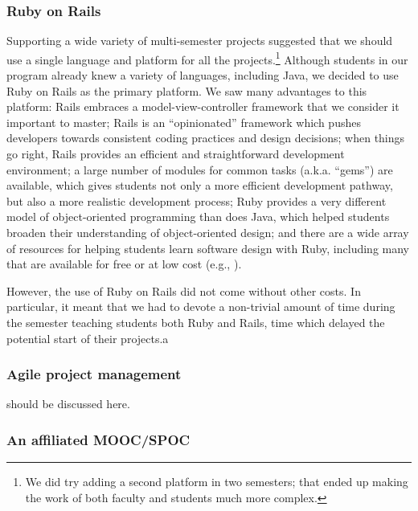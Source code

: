 
\subsubsection{Ruby on Rails}

Supporting a wide variety of multi-semester projects suggested that
we should use a single language and platform for all the
projects.\footnote{We did try adding a second platform in two
semesters; that ended up making the work of both faculty and students
much more complex.}  Although students in our program already knew
a variety of languages, including Java, we decided to use Ruby on
Rails as the primary platform.  We saw many advantages to this
platform: Rails embraces a model-view-controller framework that we
consider it important to master; Rails is an ``opinionated'' framework 
which pushes developers towards consistent coding practices and 
design decisions; when things go right, Rails
provides an efficient and straightforward development environment;
a large number of modules for common tasks (a.k.a. ``gems'') are
available, which gives students not only a more efficient development
pathway, but also a more realistic development process; Ruby
provides a very different model of object-oriented programming than
does Java, which helped students broaden their understanding of
object-oriented design; and there are a wide array of resources for
helping students learn software design with Ruby, including many
that are available for free or at low cost (e.g.,
\cite{saasbook,rails-tutorial}).

However, the use of Ruby on Rails did not come without other costs.  In
particular, it meant that we had to devote a non-trivial amount of
time during the semester teaching students both Ruby and Rails, time
which delayed the potential start of their projects.a

\subsubsection{Agile project management}

should be discussed here.

\subsubsection{An affiliated MOOC/SPOC}

